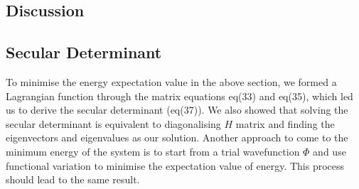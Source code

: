 \documentclass[11pt]{article}   	%
\begin{document}
	\subsection{Discussion}	
	\subsection{Secular Determinant}
	To minimise the energy expectation value in the above section, we formed a Lagrangian function through the matrix equations eq(33) and eq(35), 
	which led us to derive the secular determinant (eq(37)). We also showed that solving the secular determinant is equivalent
	 to diagonalising $H$ matrix and finding the eigenvectors and eigenvalues as our solution. Another
	 approach to come to the minimum energy of the system is to start from a trial 
	wavefunction $\Phi$ and use functional variation to minimise the expectation value of energy. This process should lead to the same result. \\ 
	
\end{document}
